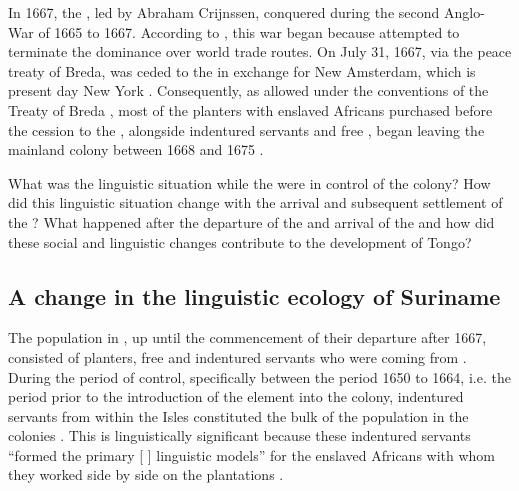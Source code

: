 In 1667, the , led by Abraham Crijnssen, conquered  during the second Anglo- War of 1665 to 1667. According to \citet{Hoefte98}, this war began because  attempted to terminate the  dominance over world trade routes. On July 31, 1667, via the peace treaty of Breda,  was ceded to the  in exchange for New Amsterdam, which is present day New York \citep{Kaufman05}. Consequently, as allowed under the conventions of the Treaty of Breda \citep[617--618]{gbhol61}, most of the  planters with enslaved Africans purchased before the cession to the , alongside indentured servants and free , began leaving the mainland colony between 1668 and 1675 \citep{Arbell02, Faber98, Godfrey95}.

What was the linguistic situation while the  were in control of the colony? How did this linguistic situation change with the arrival and subsequent settlement of the ? What happened after the departure of the  and arrival of the  and how did these social and linguistic changes contribute to the development of  Tongo?

\subsection {A change in the linguistic ecology of Suriname}\label{1.2.2}
The  population in , up until the commencement of their departure after 1667, consisted of planters, free  and indentured servants who were coming from  \citep{Arbell02, Sainsbury80}. During the period of  control, specifically between the period 1650 to 1664, i.e. the period prior to the introduction of the  element into the colony, indentured servants from within the  Isles constituted the bulk of the population in the  colonies \citep{Kenny06, Powell05, Armitage05}. This is linguistically significant because these indentured servants ``formed the primary [ ] linguistic models'' \citep[117]{Arends02} for the enslaved Africans with whom they worked side by side on the plantations \citep{Galenson02}.

